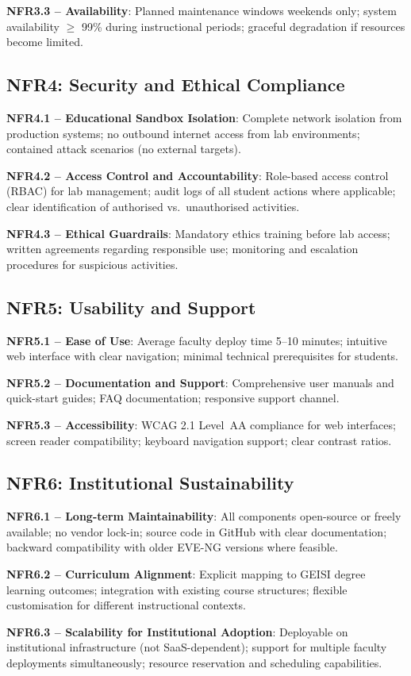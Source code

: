 \textbf{NFR3.3 -- Availability}:
Planned maintenance windows weekends only; system availability $\geq$ 99\% during
instructional periods; graceful degradation if resources become limited.

\subsection{NFR4: Security and Ethical Compliance}

\textbf{NFR4.1 -- Educational Sandbox Isolation}:
Complete network isolation from production systems; no outbound internet access from lab
environments; contained attack scenarios (no external targets).

\textbf{NFR4.2 -- Access Control and Accountability}:
Role-based access control (RBAC) for lab management; audit logs of all student actions
where applicable; clear identification of authorised vs.\ unauthorised activities.

\textbf{NFR4.3 -- Ethical Guardrails}:
Mandatory ethics training before lab access; written agreements regarding responsible use;
monitoring and escalation procedures for suspicious activities.

\subsection{NFR5: Usability and Support}

\textbf{NFR5.1 -- Ease of Use}:
Average faculty deploy time 5--10 minutes; intuitive web interface with clear navigation;
minimal technical prerequisites for students.

\textbf{NFR5.2 -- Documentation and Support}:
Comprehensive user manuals and quick-start guides; FAQ documentation; responsive support
channel.

\textbf{NFR5.3 -- Accessibility}:
WCAG 2.1 Level~AA compliance for web interfaces; screen reader compatibility; keyboard
navigation support; clear contrast ratios.

\subsection{NFR6: Institutional Sustainability}

\textbf{NFR6.1 -- Long-term Maintainability}:
All components open-source or freely available; no vendor lock-in; source code in GitHub
with clear documentation; backward compatibility with older EVE-NG versions where feasible.

\textbf{NFR6.2 -- Curriculum Alignment}:
Explicit mapping to GEISI degree learning outcomes; integration with existing course
structures; flexible customisation for different instructional contexts.

\textbf{NFR6.3 -- Scalability for Institutional Adoption}:
Deployable on institutional infrastructure (not SaaS-dependent); support for multiple
faculty deployments simultaneously; resource reservation and scheduling capabilities.
